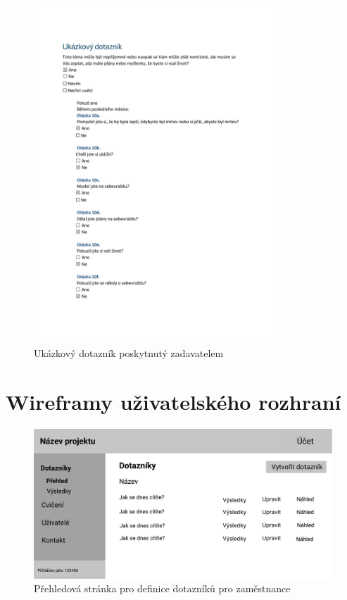 \documentclass[12pt,a4paper]{report}
\begin{document}
    \begin{figure}[H]
        \centering
        \includegraphics[width=0.8\textwidth]{../attachments/ukazkovy-dotaznik}
        \caption{Ukázkový dotazník poskytnutý zadavatelem}\label{fig:ukazkovy-dotaznik}
    \end{figure}


    \section{Wireframy uživatelského rozhraní}\label{sec:wireframy-uzivatelskeho-rozhrani}

    \begin{figure}[H]
        \centering
        \includegraphics[width=\textwidth]{../attachments/design/zamestnanec/dotazniky-prehled}
        \caption{Přehledová stránka pro definice dotazníků pro zaměstnance}\label{fig:prehled-zamestnanec}
    \end{figure}
\end{document}

